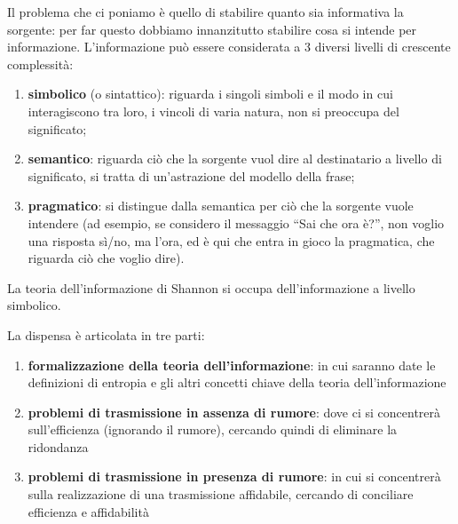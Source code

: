 Il problema che ci poniamo è quello di stabilire quanto sia informativa la sorgente: per far questo dobbiamo innanzitutto stabilire cosa si intende per informazione. L'informazione può essere considerata a 3 diversi livelli di crescente complessità:
\begin{enumerate}
\item \textbf{simbolico} (o sintattico): riguarda i singoli simboli e il modo in cui interagiscono tra loro, i vincoli di varia natura, non si preoccupa del significato;
\item \textbf{semantico}: riguarda ciò che la sorgente vuol dire al destinatario a livello di significato, si tratta di un'astrazione del modello della frase;
\item \textbf{pragmatico}: si distingue dalla semantica per ciò che la sorgente vuole intendere (ad esempio, se considero il messaggio ``Sai che ora è?'', non voglio una risposta sì/no, ma l'ora, ed è qui che entra in gioco la pragmatica, che riguarda ciò che voglio dire).
\end{enumerate}

\noindent
La teoria dell'informazione di Shannon si occupa dell'informazione a livello simbolico.

\medskip
\noindent
La dispensa è articolata in tre parti:
\begin{enumerate}
\item \textbf{formalizzazione della teoria dell'informazione}: in cui saranno date le definizioni di entropia e gli altri concetti chiave della teoria dell'informazione
\item \textbf{problemi di trasmissione in assenza di rumore}: dove ci si concentrerà sull'efficienza (ignorando il rumore), cercando quindi di eliminare la ridondanza
\item \textbf{problemi di trasmissione in presenza di rumore}: in cui si concentrerà sulla realizzazione di una trasmissione affidabile, cercando di conciliare efficienza e affidabilità
\end{enumerate}
